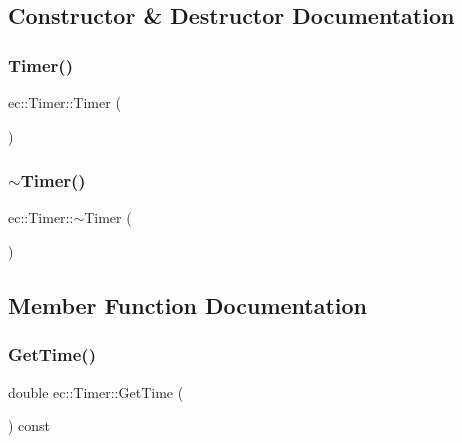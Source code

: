 \subsection{Constructor \& Destructor Documentation}
\mbox{\label{classec_1_1_timer_afa10f411221610c507291183b6b6aa56}} 
\subsubsection{\texorpdfstring{Timer()}{Timer()}}
{\footnotesize\ttfamily ec\+::\+Timer\+::\+Timer (\begin{DoxyParamCaption}{ }\end{DoxyParamCaption})\hspace{0.3cm}{\ttfamily [explicit]}}

\mbox{\label{classec_1_1_timer_a496dc6127f9d0c8ec3dc8d91de6b6448}} 
\subsubsection{\texorpdfstring{$\sim$\+Timer()}{~Timer()}}
{\footnotesize\ttfamily ec\+::\+Timer\+::$\sim$\+Timer (\begin{DoxyParamCaption}{ }\end{DoxyParamCaption})}



\subsection{Member Function Documentation}
\mbox{\label{classec_1_1_timer_acadbad5c86afeaf115596dc7dedfd303}} 
\subsubsection{\texorpdfstring{Get\+Time()}{GetTime()}}
{\footnotesize\ttfamily double ec\+::\+Timer\+::\+Get\+Time (\begin{DoxyParamCaption}{ }\end{DoxyParamCaption}) const}

